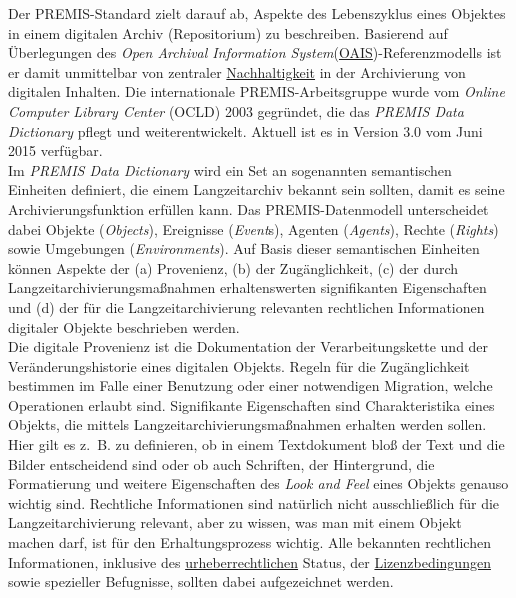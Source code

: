 \documentclass{article}
\begin{document}
    Der PREMIS-Standard zielt darauf ab, Aspekte des Lebenszyklus eines Objektes in einem digitalen Archiv (Repositorium) zu beschreiben. Basierend auf Überlegungen des \emph{Open Archival Information System}(\href{http://gams.uni-graz.at/o:konde.11}{OAIS})-Referenzmodells ist er damit unmittelbar von zentraler \href{http://gams.uni-graz.at/o:konde.6}{Nachhaltigkeit} in der Archivierung von digitalen Inhalten. Die internationale PREMIS-Arbeitsgruppe wurde vom \emph{Online Computer Library Center} (OCLD) 2003 gegründet, die das \emph{PREMIS Data Dictionary} pflegt und weiterentwickelt. Aktuell ist es in Version 3.0 vom Juni 2015 verfügbar.\\
            
        Im \emph{PREMIS Data Dictionary} wird ein Set an sogenannten semantischen Einheiten definiert, die einem Langzeitarchiv bekannt sein sollten, damit es seine Archivierungsfunktion erfüllen kann. Das PREMIS-Datenmodell unterscheidet dabei Objekte (\emph{Objects}), Ereignisse (\emph{Event}s), Agenten (\emph{Agents}), Rechte (\emph{Rights}) sowie Umgebungen (\emph{Environments}). Auf Basis dieser semantischen Einheiten können Aspekte der (a) Provenienz, (b) der Zugänglichkeit, (c) der durch Langzeitarchivierungsmaßnahmen erhaltenswerten signifikanten Eigenschaften und (d) der für die Langzeitarchivierung relevanten rechtlichen Informationen digitaler Objekte beschrieben werden.\\
            
        Die digitale Provenienz ist die Dokumentation der Verarbeitungskette und der Veränderungshistorie eines digitalen Objekts. Regeln für die Zugänglichkeit bestimmen im Falle einer Benutzung oder einer notwendigen Migration, welche Operationen erlaubt sind. Signifikante Eigenschaften sind Charakteristika eines Objekts, die mittels Langzeitarchivierungsmaßnahmen erhalten werden sollen. Hier gilt es z. B. zu definieren, ob in einem Textdokument bloß der Text und die Bilder entscheidend sind oder ob auch Schriften, der Hintergrund, die Formatierung und weitere Eigenschaften des \emph{Look and Feel} eines Objekts genauso wichtig sind. Rechtliche Informationen sind natürlich nicht ausschließlich für die Langzeitarchivierung relevant, aber zu wissen, was man mit einem Objekt machen darf, ist für den Erhaltungsprozess wichtig. Alle bekannten rechtlichen Informationen, inklusive des \href{http://gams.uni-graz.at/o:konde.44}{urheberrechtlichen} Status, der \href{http://gams.uni-graz.at/o:konde.9}{Lizenzbedingungen} sowie spezieller Befugnisse, sollten dabei aufgezeichnet werden.\\
            
\end{document}
